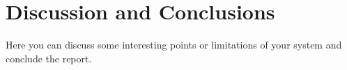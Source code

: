 \section{Discussion and Conclusions}
Here you can discuss some interesting points or limitations of your system and conclude the report.
